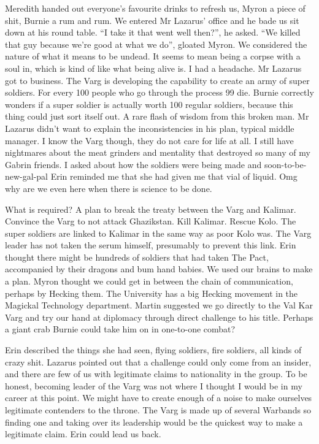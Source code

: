Meredith handed out everyone’s favourite drinks to refresh us, Myron a piece of shit, Burnie a rum and rum. We entered Mr Lazarus’ office and he bade us sit down at his round table. “I take it that went well then?”, he asked. “We killed that guy because we’re good at what we do”, gloated Myron. We considered the nature of what it means to be undead. It seems to mean being a corpse with a soul in, which is kind of like what being alive is. I had a headache. Mr Lazarus got to business. The Varg is developing the capability to create an army of super soldiers. For every 100 people who go through the process 99 die. Burnie correctly wonders if a super soldier is actually worth 100 regular soldiers, because this thing could just sort itself out. A rare flash of wisdom from this broken man. Mr Lazarus didn’t want to explain the inconsistencies in his plan, typical middle manager. I know the Varg though, they do not care for life at all. I still have nightmares about the meat grinders and mentality that destroyed so many of my Gabrin friends. I asked about how the soldiers were being made and soon-to-be-new-gal-pal Erin reminded me that she had given me that vial of liquid. Omg why are we even here when there is science to be done.\medskip

What is required? A plan to break the treaty between the Varg and Kalimar. Convince the Varg to not attack Ghazikstan. Kill Kalimar. Rescue Kolo. The super soldiers are linked to Kalimar in the same way as poor Kolo was. The Varg leader has not taken the serum himself, presumably to prevent this link. Erin thought there might be hundreds of soldiers that had taken The Pact, accompanied by their dragons and bum hand babies. We used our brains to make a plan. Myron thought we could get in between the chain of communication, perhaps by Hecking them. The University has a big Hecking movement in the Magickal Technology department. Martin suggested we go directly to the Val Kar Varg and try our hand at diplomacy through direct challenge to his title. Perhaps a giant crab Burnie could take him on in one-to-one combat?\medskip

Erin described the things she had seen, flying soldiers, fire soldiers, all kinds of crazy shit. Lazarus pointed out that a challenge could only come from an insider, and there are few of us with legitimate claims to nationality in the group. To be honest, becoming leader of the Varg was not where I thought I would be in my career at this point. We might have to create enough of a noise to make ourselves legitimate contenders to the throne. The Varg is made up of several Warbands so finding one and taking over its leadership would be the quickest way to make a legitimate claim. Erin could lead us back.\medskip

